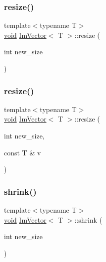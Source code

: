 \mbox{\label{structImVector_ac371dd62e56ae486b1a5038cf07eee56}} 
\subsubsection{\texorpdfstring{resize()}{resize()}\hspace{0.1cm}{\footnotesize\ttfamily [1/2]}}
{\footnotesize\ttfamily template$<$typename T$>$ \\
\hyperlink{imgui__impl__opengl3__loader_8h_ac668e7cffd9e2e9cfee428b9b2f34fa7}{void} \hyperlink{structImVector}{Im\+Vector}$<$ T $>$\+::resize (\begin{DoxyParamCaption}\item[{int}]{new\+\_\+size }\end{DoxyParamCaption})\hspace{0.3cm}{\ttfamily [inline]}}

\mbox{\label{structImVector_abe7f21776ecfb7d0214963fd8c0689f0}} 
\subsubsection{\texorpdfstring{resize()}{resize()}\hspace{0.1cm}{\footnotesize\ttfamily [2/2]}}
{\footnotesize\ttfamily template$<$typename T$>$ \\
\hyperlink{imgui__impl__opengl3__loader_8h_ac668e7cffd9e2e9cfee428b9b2f34fa7}{void} \hyperlink{structImVector}{Im\+Vector}$<$ T $>$\+::resize (\begin{DoxyParamCaption}\item[{int}]{new\+\_\+size,  }\item[{const T \&}]{v }\end{DoxyParamCaption})\hspace{0.3cm}{\ttfamily [inline]}}

\mbox{\label{structImVector_a8dafcce1e393244890f52ef1aa490876}} 
\subsubsection{\texorpdfstring{shrink()}{shrink()}}
{\footnotesize\ttfamily template$<$typename T$>$ \\
\hyperlink{imgui__impl__opengl3__loader_8h_ac668e7cffd9e2e9cfee428b9b2f34fa7}{void} \hyperlink{structImVector}{Im\+Vector}$<$ T $>$\+::shrink (\begin{DoxyParamCaption}\item[{int}]{new\+\_\+size }\end{DoxyParamCaption})\hspace{0.3cm}{\ttfamily [inline]}}

